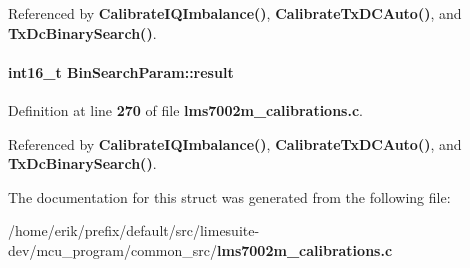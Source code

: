 Referenced by {\bf Calibrate\+I\+Q\+Imbalance()}, {\bf Calibrate\+Tx\+D\+C\+Auto()}, and {\bf Tx\+Dc\+Binary\+Search()}.

\paragraph[{result}]{\setlength{\rightskip}{0pt plus 5cm}int16\+\_\+t Bin\+Search\+Param\+::result}\label{structBinSearchParam_a9ba03b2c25c9b82775dec54a382c0441}


Definition at line {\bf 270} of file {\bf lms7002m\+\_\+calibrations.\+c}.



Referenced by {\bf Calibrate\+I\+Q\+Imbalance()}, {\bf Calibrate\+Tx\+D\+C\+Auto()}, and {\bf Tx\+Dc\+Binary\+Search()}.



The documentation for this struct was generated from the following file\+:\begin{DoxyCompactItemize}
\item 
/home/erik/prefix/default/src/limesuite-\/dev/mcu\+\_\+program/common\+\_\+src/{\bf lms7002m\+\_\+calibrations.\+c}\end{DoxyCompactItemize}
